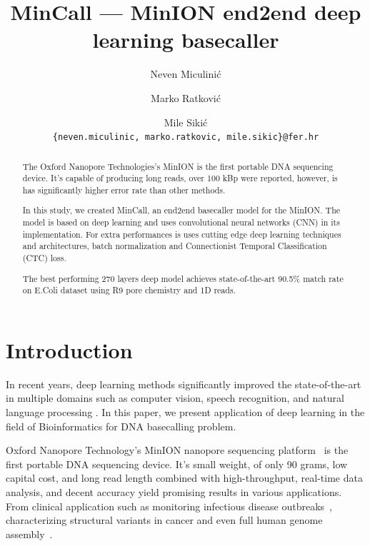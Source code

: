 \documentclass[runningheads,a4paper]{llncs}
\begin{document}
\frontmatter

\title{MinCall --- MinION end2end deep learning basecaller}
\author{Neven Miculinić \and Marko Ratković \and Mile Sikić\\
\texttt{\{neven.miculinic, marko.ratkovic, mile.sikic\}@fer.hr}}

\maketitle

\begin{abstract}
    The Oxford Nanopore Technologies's MinION is the first portable DNA sequencing device. It's capable of producing long reads, over 100 kBp were reported, however, is has significantly higher error rate than other methods.

    In this study, we created MinCall, an end2end basecaller model for the MinION. The model is based on deep learning and uses convolutional neural networks (CNN) in its implementation. For extra performances is uses cutting edge deep learning techniques and architectures, batch normalization and Connectionist Temporal Classification (CTC) loss.

    The best performing 270 layers deep model achieves state-of-the-art 90.5\% match rate on E.Coli dataset using R9 pore chemistry and 1D reads.
\end{abstract}

\section{Introduction}
In recent years, deep learning methods significantly improved the state-of-the-art in multiple domains such as computer vision, speech recognition, and natural language processing \cite{LeCun:1998:CNI:303568.303704}\cite{NIPS2012_4824}.
In this paper, we present application of deep learning in the field of  Bioinformatics for DNA basecalling problem.

Oxford Nanopore Technology's MinION nanopore sequencing platform~\cite{mikheyev2014first} is the first portable DNA sequencing device. It's small weight, of only 90 grams, low capital cost, and long read length combined with high-throughput, real-time data analysis, and decent accuracy yield promising results in various applications. From clinical application such as monitoring infectious disease outbreaks~\cite{judge2015early}\cite{quick2016real}, characterizing structural variants in cancer\cite{norris2016nanopore} and even full human genome assembly~\cite{jain2017nanopore}.
\end{document}
